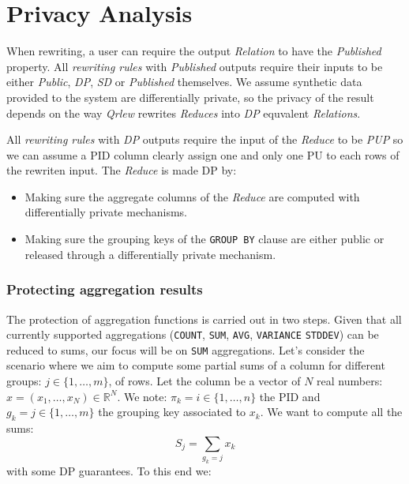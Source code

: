 \documentclass[letterpaper]{article} %
\newcommand{\qrlew}{\emph{Qrlew}}
\begin{document}
\section{Privacy Analysis}
\label{sec:privacy_analysis}

When rewriting, a user can require the output \emph{Relation} to have the \emph{Published} property. All \emph{rewriting rules} with \emph{Published} outputs require their inputs to be either \emph{Public}, \emph{DP}, \emph{SD} or \emph{Published} themselves. We assume synthetic data provided to the system are differentially private, so the privacy of the result depends on the way \qrlew{} rewrites \emph{Reduces} into \emph{DP} equvalent \emph{Relations}.

All \emph{rewriting rules} with \emph{DP} outputs require the input of the \emph{Reduce} to be \emph{PUP} so we can assume a PID column clearly assign one and only one PU to each rows of the rewriten input. The \emph{Reduce} is made DP by:
\begin{itemize}
    \item Making sure the aggregate columns of the \emph{Reduce} are computed with differentially private mechanisms.
    \item Making sure the grouping keys of the \texttt{GROUP BY} clause are either public or released through a differentially private mechanism.
\end{itemize}

\subsubsection{Protecting aggregation results}

The protection of aggregation functions is carried out in two steps. Given that all currently supported aggregations (\texttt{COUNT}, \texttt{SUM}, \texttt{AVG}, \texttt{VARIANCE} \texttt{STDDEV}) can be reduced to sums, our focus will be on \texttt{SUM} aggregations. Let's consider the scenario where we aim to compute some partial sums of a column for different groups: $j\in\{1,\ldots,m\}$, of rows.
Let the column be a vector of $N$ real numbers: $x = \left(x_1,\ldots, x_N\right)\in\mathbb{R}^N$. We note: $\pi_k = i \in \{1,\ldots,n\}$ the PID and $g_k = j \in \{1,\ldots,m\}$ the grouping key associated to $x_k$.
We want to compute all the sums:
$$S_j = \sum_{g_k = j} x_k$$
with some DP guarantees. To this end we:
\end{document}
